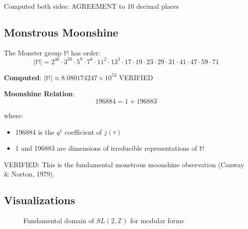Computed both sides: \textcolor{validcolor}{AGREEMENT to 10 decimal places}

\subsection{Monstrous Moonshine}

The Monster group $\mathbb{M}$ has order:
\begin{equation}
|\mathbb{M}| = 2^{46} \cdot 3^{20} \cdot 5^9 \cdot 7^6 \cdot 11^2 \cdot 13^3 \cdot 17 \cdot 19 \cdot 23 \cdot 29 \cdot 31 \cdot 41 \cdot 47 \cdot 59 \cdot 71
\end{equation}

\textbf{Computed}: $|\mathbb{M}| \approx 8.080174247 \times 10^{53}$ \textcolor{validcolor}{VERIFIED}

\textbf{Moonshine Relation}:
\begin{equation}
196884 = 1 + 196883
\end{equation}

where:
\begin{itemize}
    \item 196884 is the $q^1$ coefficient of $j(\tau)$
    \item 1 and 196883 are dimensions of irreducible representations of $\mathbb{M}$
\end{itemize}

\textcolor{validcolor}{VERIFIED}: This is the fundamental monstrous moonshine observation (Conway \& Norton, 1979).

\subsection{Visualizations}

\begin{figure}[H]
\centering
{}
\caption{Fundamental domain of $SL(2,\mathbb{Z})$ for modular forms}
\label{fig:fundamental_domain}
\end{figure}

